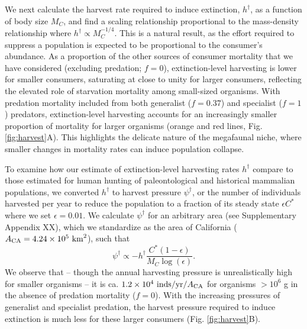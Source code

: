 \documentclass[]{rsos}%
\begin{document}
We next calculate the harvest rate required to induce extinction, $h^\dagger$, as a function of body size $M_C$, and find a scaling relationship proportional to the mass-density relationship where $h^\dagger \propto M_C^{-1/4}$.
This is a natural result, as the effort required to suppress a population is expected to be proportional to the consumer's abundance. 
As a proportion of the other sources of consumer mortality that we have considered (excluding predation; $f=0$), extinction-level harvesting is lower for smaller consumers, saturating at close to unity for larger consumers, reflecting the elevated role of starvation mortality among small-sized organisms.
With predation mortality included from both generalist ($f = 0.37$) and specialist ($f=1$) predators, extinction-level harvesting accounts for an increasingly smaller proportion of mortality for larger organisms (orange and red lines, Fig. \ref{fig:harvest}A).
This highlights the delicate nature of the megafaunal niche, where smaller changes in mortality rates can induce population collapse.

To examine how our estimate of extinction-level harvesting rates $h^\dagger$ compare to those estimated for human hunting of paleontological and historical mammalian populations, we converted $h^\dagger$ to harvest pressure $\psi^\dagger$, or the number of individuals harvested per year to reduce the population to a fraction of its steady state $\epsilon C^*$ where we set $\epsilon = 0.01$.
We calculate $\psi^\dagger$ for an arbitrary area (see Supplementary Appendix XX), which we standardize as the area of California ($A_{\rm CA} = 4.24\times10^5~{\rm km}^2$), such that
\begin{equation}
    \psi^\dagger \propto -h^\dagger\frac{C^*(1-\epsilon)}{M_C \log(\epsilon)}.
\end{equation}
We observe that -- though the annual harvesting pressure is unrealistically high for smaller organisms -- it is ca. $1.2\times10^4~{\rm inds/yr/}A_{\rm CA}$ for organisms $>10^6$ g in the absence of predation mortality ($f=0$).
With the increasing pressures of generalist and specialist predation, the harvest pressure required to induce extinction is much less for these larger consumers (Fig. \ref{fig:harvest}B).
\end{document}
